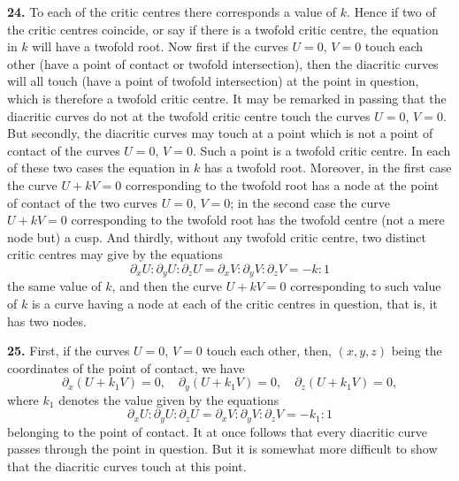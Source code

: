 \documentclass[11pt,a4paper]{article}
\begin{document}
\medskip

\textbf{24.} To each of the critic centres there corresponds a value of $k$. Hence if two of the critic centres coincide, or say if there is a twofold critic centre, the equation in $k$ will have a twofold root. Now first if the curves $U = 0$, $V = 0$ touch each other (have a point of contact or twofold intersection), then the diacritic curves will all touch (have a point of twofold intersection) at the point in question, which is therefore a twofold critic centre. It may be remarked in passing that the diacritic curves do not at the twofold critic centre touch the curves $U = 0$, $V = 0$. But secondly, the diacritic curves may touch at a point which is not a point of contact of the curves $U = 0$, $V = 0$. Such a point is a twofold critic centre. In each of these two cases the equation in $k$ has a twofold root. Moreover, in the first case the curve $U + kV = 0$ corresponding to the twofold root has a node at the point of contact of the two curves $U = 0$, $V = 0$; in the second case the curve $U + kV = 0$ corresponding to the twofold root has the twofold centre (not a mere node but) a cusp. And thirdly, without any twofold critic centre, two distinct critic centres may give by the equations
\[
\partial_x U : \partial_y U : \partial_z U = \partial_x V : \partial_y V : \partial_z V = -k : 1
\]
the same value of $k$, and then the curve $U + kV = 0$ corresponding to such value of $k$ is a curve having a node at each of the critic centres in question, that is, it has two nodes.

\medskip

\textbf{25.} First, if the curves $U = 0$, $V = 0$ touch each other, then, $(x, y, z)$ being the coordinates of the point of contact, we have
\[
\partial_x(U + k_1 V) = 0,\quad \partial_y(U + k_1 V) = 0,\quad \partial_z(U + k_1 V) = 0,
\]
where $k_1$ denotes the value given by the equations
\[
\partial_x U : \partial_y U : \partial_z U = \partial_x V : \partial_y V : \partial_z V = -k_1 : 1
\]
belonging to the point of contact. It at once follows that every diacritic curve passes through the point in question. But it is somewhat more difficult to show that the diacritic curves touch at this point.

\medskip
\end{document}

